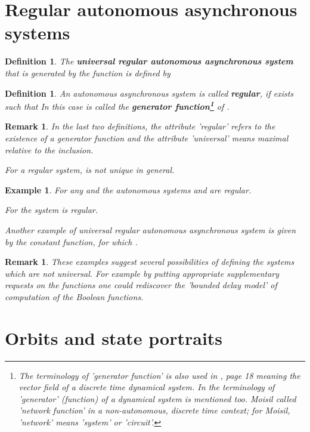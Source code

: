 \documentclass[12pt]{article}\usepackage{amsmath}
\newtheorem{definition}[theorem]{Definition}
\newtheorem{example}[theorem]{Example}
\newtheorem{remark}[theorem]{Remark}
\begin{document}
\section{Regular autonomous asynchronous systems}

\begin{definition}
The \textbf{universal regular autonomous asynchronous system}  that is generated by the function  is defined by


\end{definition}

\begin{definition}
An autonomous asynchronous system  is called
\textbf{regular}, if  exists such that  In this
case  is called the \textbf{generator function\footnote{The terminology
of 'generator function' is also used in \cite{bib4}, page 18 meaning the
vector field of a discrete time dynamical system. In \cite{bib6} the
terminology of 'generator' (function) of a dynamical system is mentioned too.
Moisil called  'network function' in a non-autonomous, discrete time
context; for Moisil, 'network' means 'system' or 'circuit'.}} of .
\end{definition}

\begin{remark}
In the last two definitions, the attribute 'regular' refers to the existence
of a generator function  and the attribute 'universal' means maximal
relative to the inclusion.

For a regular system,  is not unique in general.
\end{remark}

\begin{example}
For any  and  the autonomous
systems    and  are regular.

For  the system  is regular.

Another example of universal regular autonomous asynchronous system is given
by  the constant function, for which .
\end{example}

\begin{remark}
These examples suggest several possibilities of defining the systems
 which are not universal. For example by putting
appropriate supplementary requests on the functions  one could
rediscover the 'bounded delay model' of computation of the Boolean functions.
\end{remark}

\section{Orbits and state portraits}
\end{document}
